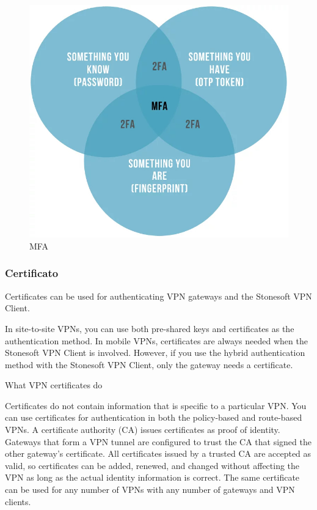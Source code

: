 \begin{figure}[ht]
    \centering
    \includegraphics[width=12cm]{figure/mfa.jpeg}
    \caption{MFA}
\end{figure}

\subsubsection{Certificato}
Certificates can be used for authenticating VPN gateways and the Stonesoft VPN Client.

In site-to-site VPNs, you can use both pre-shared keys and certificates as the authentication method. In mobile VPNs, certificates are always needed when the Stonesoft VPN Client is involved. However, if you use the hybrid authentication method with the Stonesoft VPN Client, only the gateway needs a certificate.

What VPN certificates do

Certificates do not contain information that is specific to a particular VPN. You can use certificates for authentication in both the policy-based and route-based VPNs. A certificate authority (CA) issues certificates as proof of identity. Gateways that form a VPN tunnel are configured to trust the CA that signed the other gateway's certificate. All certificates issued by a trusted CA are accepted as valid, so certificates can be added, renewed, and changed without affecting the VPN as long as the actual identity information is correct. The same certificate can be used for any number of VPNs with any number of gateways and VPN clients.

